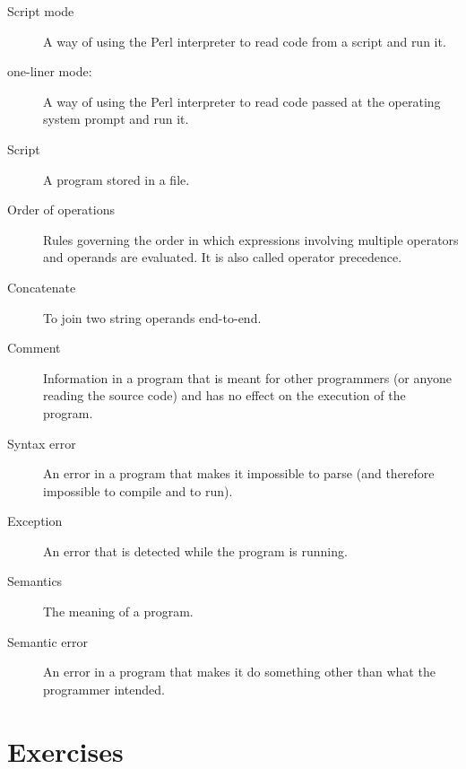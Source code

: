 \begin{description}
\item[Script mode] A way of using the Perl interpreter to read
code from a script and run it.

\item[one-liner mode:] A way of using the Perl interpreter to read
code passed at the operating system prompt and run it.

\item[Script] A program stored in a file.

\item[Order of operations]  Rules governing the order in which
expressions involving multiple operators and operands are evaluated.
It is also called operator precedence.

\item[Concatenate]  To join two string operands end-to-end.

\item[Comment]  Information in a program that is meant for other
programmers (or anyone reading the source code) and has no effect on the
execution of the program.

\item[Syntax error]  An error in a program that makes it impossible
to parse (and therefore impossible to compile and to run).

\item[Exception]  An error that is detected while the program is running.

\item[Semantics]  The meaning of a program.

\item[Semantic error]   An error in a program that makes it do something
other than what the programmer intended.

\end{description}


\section{Exercises}

